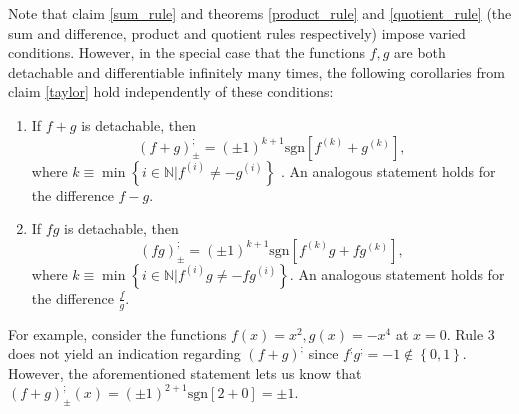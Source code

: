 \documentclass[11pt]{book}
\begin{document}
\begin{remark}Note that claim \ref{sum_rule} and theorems \ref{product_rule} and \ref{quotient_rule} (the sum and difference, product and quotient rules respectively) impose varied conditions. However, in the special case that the functions $f,g$ are both detachable and differentiable infinitely many times, the following corollaries from claim \ref{taylor} hold independently of these conditions:

\begin{enumerate}
\item If $f+g$ is detachable, then $$\left(f+g\right)_{\pm}^{;}=\left(\pm1\right)^{k+1}\text{sgn}\left[f^{\left(k\right)}+g^{\left(k\right)}\right],$$ where $k\equiv\min\left\{ i\in\mathbb{N}|f^{\left(i\right)}\neq-g^{\left(i\right)}\right\}$ . An analogous statement holds for the difference $f-g$.
\item If $fg$ is detachable, then $$\left(fg\right)_{\pm}^{;}=\left(\pm1\right)^{k+1}\text{sgn}\left[f^{\left(k\right)}g+fg^{\left(k\right)}\right],$$ where $k\equiv\min\left\{ i\in\mathbb{N}|f^{\left(i\right)}g\neq-fg^{\left(i\right)}\right\}.$  An analogous statement holds for the difference $\frac{f}{g}$.
\end{enumerate}

For example, consider the functions $f\left(x\right)=x^{2},g\left(x\right)=-x^{4}$ at $x=0$. Rule 3 does not yield an indication regarding $\left(f+g\right)^{;}$ since $f^{;}g^{;}=-1\notin\left\{ 0,1\right\}$. However, the aforementioned statement lets us know that $\left(f+g\right)_{\pm}^{;}\left(x\right)=\left(\pm1\right)^{2+1}\text{sgn}\left[2+0\right]=\pm1$.
\end{remark}
\end{document}
